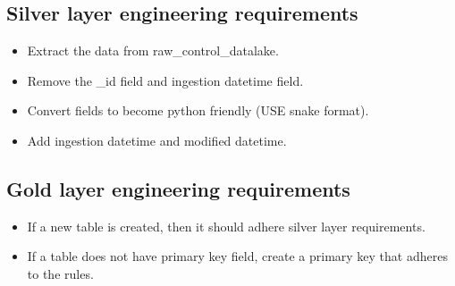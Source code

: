 \documentclass{article}
\begin{document}
\subsection{Silver layer engineering requirements}
\begin{itemize}
    \item Extract the data from raw\_control\_datalake.
    \item Remove the \_id field and ingestion datetime field.
    \item Convert fields to become python friendly (USE snake format).
    \item Add ingestion datetime and modified datetime.
\end{itemize}
\subsection{Gold layer engineering requirements}
\begin{itemize}
    \item If a new table is created, then it should adhere silver layer requirements.
    \item If a table does not have primary key field, create a primary key that adheres to the rules.
\end{itemize}
\end{document}
